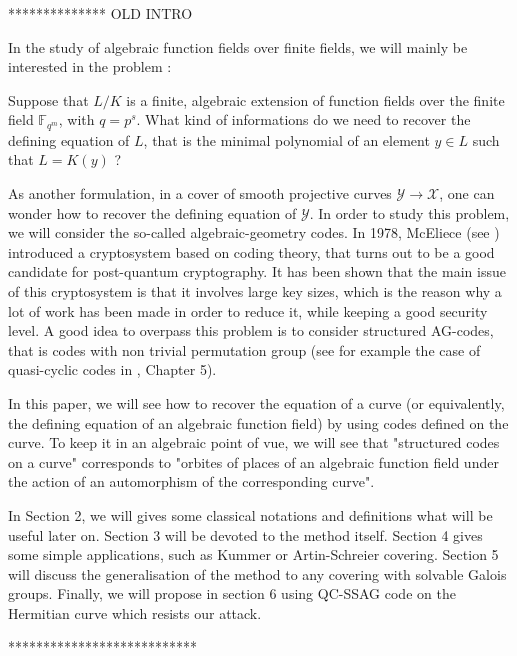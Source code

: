 \documentclass[10pt]{article}
\newcommand{\s}{\vspace{0.3cm}}
\newcommand{\fqm}{\mathbb{F}_{q^m}}
\newcommand{\X}{\mathcal{X}}
\newcommand{\Y}{\mathcal{Y}}
\begin{document}
\s

************** OLD INTRO

\s

In the study of algebraic function fields over finite fields, we will mainly be interested in the problem : 

\s

Suppose that $L/K$ is a finite, algebraic extension of function fields over the finite field $\fqm$, with $q=p^s$. What kind of informations do we need to recover the defining equation of $L$, that is the minimal polynomial of an element $y \in L$ such that $L=K(y)$ ?

\s

As another formulation, in a cover of smooth projective curves $\Y \rightarrow \X$, one can wonder how to recover the defining equation of $\Y$. In order to study this problem, we will consider the so-called algebraic-geometry codes. In 1978, McEliece  (see \cite{McE}) introduced a cryptosystem based on coding theory, that turns out to be a good candidate for post-quantum cryptography. It has been shown that the main issue of this cryptosystem is that it involves large key sizes, which is the reason why a lot of work has been made in order to reduce it, while keeping a good security level. A good idea to overpass this problem is to consider structured AG-codes, that is codes with non trivial permutation group (see for example the case of quasi-cyclic codes in \cite{Bar}, Chapter 5).  

\s

In this paper, we will see how to recover the equation of a curve (or equivalently, the defining equation of an algebraic function field) by using codes defined on the curve. To keep it in an algebraic point of vue, we will see that "structured codes on a curve" corresponds to "orbites of places of an algebraic function field under the action of an automorphism of the corresponding curve".

\s

In Section 2, we will gives some classical notations and definitions what will be useful later on. Section 3 will be devoted to the method itself. Section 4 gives some simple applications, such as Kummer or Artin-Schreier covering. Section 5 will discuss the generalisation of the method to any covering with solvable Galois groups. Finally, we will propose in section 6 using QC-SSAG code on the Hermitian curve which resists our attack.

\s

***************************
\end{document}
